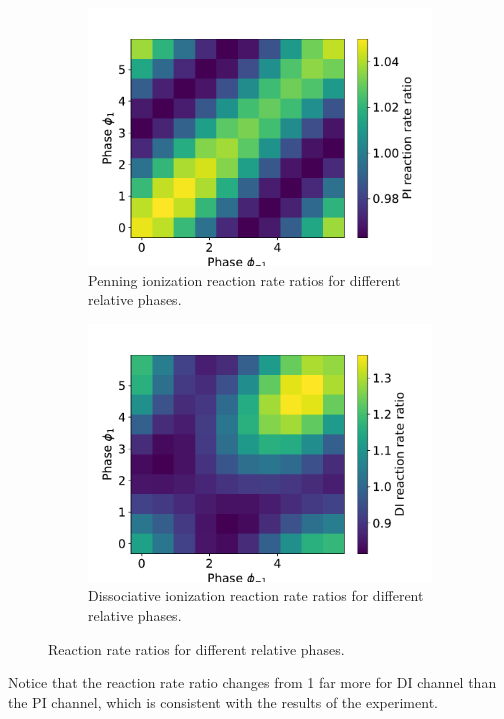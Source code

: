 \documentclass{article}
\begin{document}
    \begin{figure}[H]
        \centering
        \begin{subfigure}{.4\linewidth}
            \centering
            \includegraphics[width=\linewidth]{PI_reaction_ratio_phases_2d.pdf}
            \caption{Penning ionization reaction rate ratios for different relative phases.}
        \end{subfigure}
        \begin{subfigure}{.4\linewidth}
            \centering
            \includegraphics[width=\linewidth]{DI_reaction_ratio_phases_2d.pdf}
            \caption{Dissociative ionization reaction rate ratios for different relative phases.}
        \end{subfigure}     
        \caption{Reaction rate ratios for different relative phases.}
    \end{figure}
    Notice that the reaction rate ratio changes from 1 far more for DI channel than the PI channel, 
    which is consistent with the results of the experiment.
\end{document}
